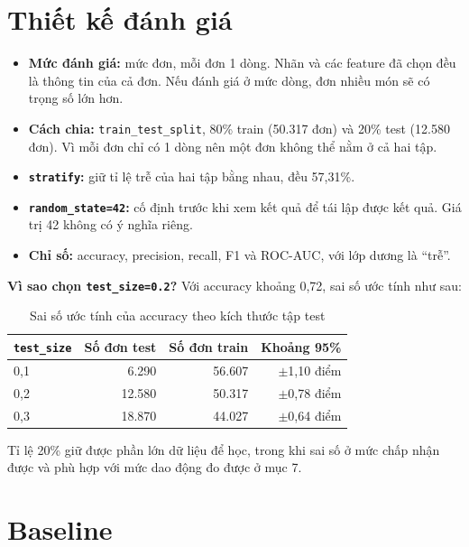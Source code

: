 \documentclass[11pt,a4paper]{article}
\begin{document}
\section{Thiết kế đánh giá}

\begin{itemize}
  \item \textbf{Mức đánh giá:} mức đơn, mỗi đơn 1 dòng. Nhãn và các feature đã chọn đều là thông tin của cả đơn. Nếu đánh giá ở mức dòng, đơn nhiều món sẽ có trọng số lớn hơn.
  \item \textbf{Cách chia:} \texttt{train\_test\_split}, 80\% train (50.317 đơn) và 20\% test (12.580 đơn). Vì mỗi đơn chỉ có 1 dòng nên một đơn không thể nằm ở cả hai tập.
  \item \textbf{\texttt{stratify}:} giữ tỉ lệ trễ của hai tập bằng nhau, đều 57,31\%.
  \item \textbf{\texttt{random\_state=42}:} cố định trước khi xem kết quả để tái lập được kết quả. Giá trị 42 không có ý nghĩa riêng.
  \item \textbf{Chỉ số:} accuracy, precision, recall, F1 và ROC-AUC, với lớp dương là ``trễ''.
\end{itemize}

\textbf{Vì sao chọn \texttt{test\_size=0.2}?} Với accuracy khoảng 0,72, sai số ước tính như sau:

\begin{table}[H]\centering
\caption{Sai số ước tính của accuracy theo kích thước tập test}
\begin{tabular}{lrrr}
\toprule
\textbf{\texttt{test\_size}} & \textbf{Số đơn test} & \textbf{Số đơn train} & \textbf{Khoảng 95\%} \\
\midrule
0,1 & 6.290 & 56.607 & $\pm$1,10 điểm \\
0,2 & 12.580 & 50.317 & $\pm$0,78 điểm \\
0,3 & 18.870 & 44.027 & $\pm$0,64 điểm \\
\bottomrule
\end{tabular}
\end{table}

Tỉ lệ 20\% giữ được phần lớn dữ liệu để học, trong khi sai số ở mức chấp nhận được và phù hợp với mức dao động đo được ở mục 7.

\section{Baseline}
\end{document}
